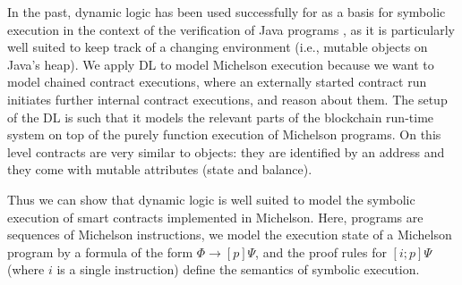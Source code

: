 \begin{comment}
  Such formulas are verified by successively reducing the program it
  contains until one is left with a purely first order formula that
  does not contain programs anymore, which can then be verified using
  the calculus of the first order logic that the DL is based on:
  \begin{align*}
    \langle i ; i' ; &\cdots ; i^n \rangle \phi
    \\ \leftrightarrow	\qquad		\langle     i' ; &\cdots ; i^n \rangle \phi'
    \\							 &\quad\vdots
    \\ \leftrightarrow	\qquad	\langle \rangle \phi^n	 &\leftrightarrow \phi^n
    \\							 &\quad\vdots
  \end{align*}

  This thesis focuses on these symbolic execution rules of the
  calculus and their soundness proof.  Firstly, we choose a
  representative subset of Michelson and give a reference
  implementation of it.  Then we define the symbolic execution rules
  for that subset and prove their soundness with respect to the
  reference implementation.
\end{comment}



In the past, dynamic
logic has been used successfully for as a basis for symbolic execution
in the context of the verification of Java programs \cite{KeY3}, as it
is particularly well suited to keep track of a changing environment (i.e., mutable
objects on Java's heap). 
We apply DL to model Michelson execution because we want to model
chained contract executions, where an externally started contract run
initiates further internal contract executions,  and reason about
them.
The setup of the DL is such that it models the relevant parts of the
blockchain run-time system on top of the purely function execution of
Michelson programs. On this level contracts are very similar
to objects: they are identified by an address and they come with
mutable attributes (state and balance). 


Thus we can show that dynamic logic is
well suited to model the symbolic execution of smart contracts implemented
in Michelson.
Here, programs are sequences of Michelson instructions, we model the
execution state of a Michelson program by a formula of the form $\Phi \to [p]\Psi$, and the proof
rules for $[i;p]\Psi$ (where $i$ is a single instruction) define the
semantics of symbolic execution.

